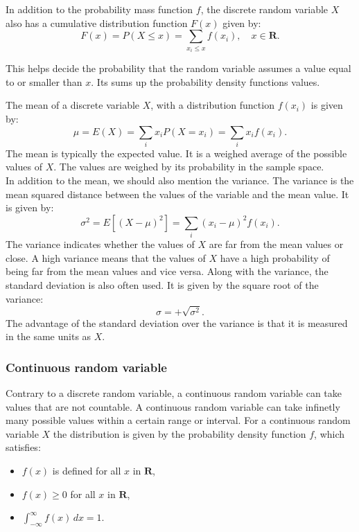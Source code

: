 \noindent In addition to the probability mass function $f$, the discrete random variable $X$ also has a cumulative distribution function $F(x)$ given by:
$$F(x) = P(X \leq x) = \sum_{x_i \leq x} f(x_i), \quad x \in \textbf{R}.$$

\noindent This helps decide the probability that the random variable assumes a value equal to or smaller than $x$. Its sums up the probability density functions values.
\newline

\noindent The mean of a discrete variable $X$, with a distribution function $f(x_{i})$ is given by:
$$\mu = E(X) = \sum_i x_i P(X = x_i) = \sum_i x_i f(x_i).$$
The mean is typically the expected value. It is a weighed average of the possible values of $X$. The values are weighed by its probability in the sample space.
\\

\noindent In addition to the mean, we should also mention the variance. The variance is the mean squared distance between the values of the variable and the mean value. It is given by:
$$\sigma^2 = E\left[(X - \mu)^2\right] = \sum_{i} (x_i - \mu)^2 f(x_i).$$
The variance indicates whether the values of $X$ are far from the mean values or close. A high variance means that the values of $X$ have a high probability of being far from the mean values and vice versa. Along with the variance, the standard deviation is also often used. It is given by the square root of the variance:
$$\sigma=+\sqrt{\sigma^2}.$$
The advantage of the standard deviation over the variance is that it is measured in the same units as $X$.

\subsubsection{Continuous random variable}
Contrary to a discrete random variable, a continuous random variable can take values that are not countable. A continuous random variable can take infinetly many possible values within a certain range or interval. For a continuous random variable $X$ the distribution is given by the probability density function $f$, which satisfies:

\begin{itemize}
	\item $f(x)$ is defined for all $x$ in $\textbf{R}$,
	\item $f(x) \geq 0$ for all $x$ in $\textbf{R}$,
	\item $\int_{-\infty}^{\infty} f(x) \, dx = 1.$
\end{itemize}

